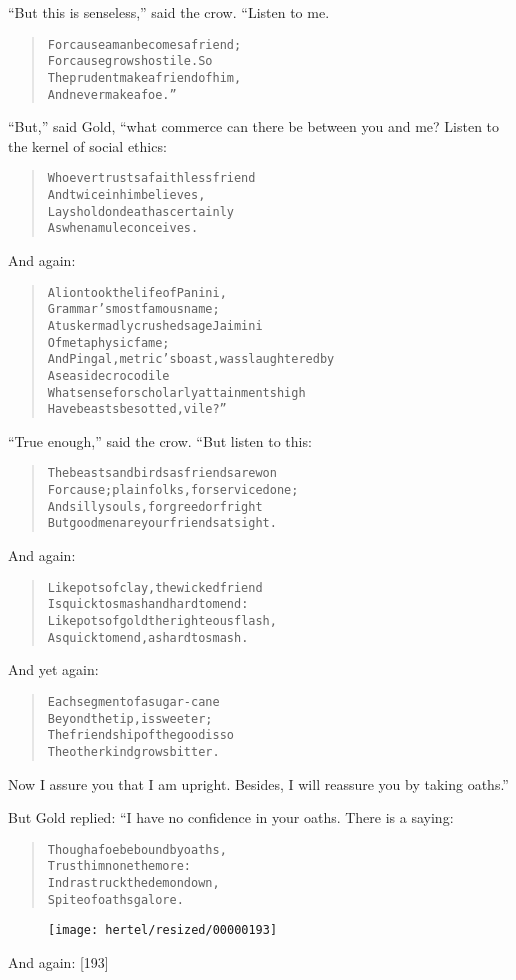 \documentclass[article, twoside, 10pt]{memoir}
\renewenvironment{verbatim}{%
\begin{quote}%
\vskip -10pt%
\begin{alltt}\normalfont\small}{\end{alltt}%
\end{quote}%
\vskip -10pt
} %
\begin{document}
``But this is senseless,'' said the crow. “Listen to me.

\begin{verbatim}
For cause a man becomes a friend;
    For cause grows hostile. So
The prudent make a friend of him,
    And never make a foe.”
\end{verbatim}
``But,'' said Gold, “what commerce can there be between you and me?
Listen to the kernel of social ethics:

\begin{verbatim}
Whoever trusts a faithless friend
    And twice in him believes,
Lays hold on death as certainly
    As when a mule conceives.
\end{verbatim}
And again:

\begin{verbatim}
A lion took the life of Panini,
    Grammar's most famous name;
A tusker madly crushed sage Jaimini
    Of metaphysic fame;
And Pingal, metric's boast, was slaughtered by
    A seaside crocodile{\textemdash}
What sense for scholarly attainments high
    Have beasts besotted, vile?”
\end{verbatim}
``True enough,'' said the crow. “But listen to this:

\begin{verbatim}
The beasts and birds as friends are won
For cause; plain folks, for service done;
And silly souls, for greed or fright{\textemdash}
But good men are your friends at sight.
\end{verbatim}
And again:

\begin{verbatim}
Like pots of clay, the wicked friend
Is quick to smash and hard to mend:
Like pots of gold the righteous flash,
As quick to mend, as hard to smash.
\end{verbatim}
And yet again:

\begin{verbatim}
Each segment of a sugar-cane
    Beyond the tip, is sweeter;
The friendship of the good is so{\textemdash}
    The other kind grows bitter.
\end{verbatim}
Now I assure you that I am upright. Besides, I will reassure you by
taking oaths.”

But Gold replied: “I have no confidence in your oaths. There is a
saying:

\begin{verbatim}
Though a foe be bound by oaths,
    Trust him none the more:
Indra struck the demon down,
    Spite of oaths galore.
\end{verbatim}
\begin{figure}[p]\texttt{[image: hertel/resized/00000193]}\end{figure}And again: [193]
\end{document}
